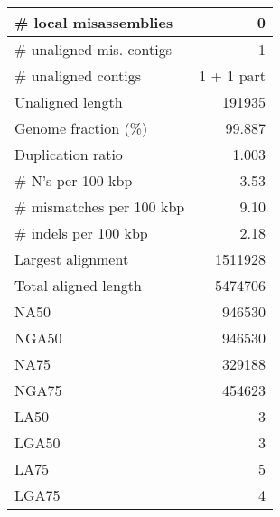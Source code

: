 \documentclass[12pt,a4paper]{article}
\begin{document}
\begin{table}[ht]
\begin{center}
\begin{tabular}{|l*{1}{|r}|}
\# local misassemblies & 0 \\ \hline
\# unaligned mis. contigs & 1 \\ \hline
\# unaligned contigs & 1 + 1 part \\ \hline
Unaligned length & 191935 \\ \hline
Genome fraction (\%) & 99.887 \\ \hline
Duplication ratio & 1.003 \\ \hline
\# N's per 100 kbp & 3.53 \\ \hline
\# mismatches per 100 kbp & 9.10 \\ \hline
\# indels per 100 kbp & 2.18 \\ \hline
Largest alignment & 1511928 \\ \hline
Total aligned length & 5474706 \\ \hline
NA50 & 946530 \\ \hline
NGA50 & 946530 \\ \hline
NA75 & 329188 \\ \hline
NGA75 & 454623 \\ \hline
LA50 & 3 \\ \hline
LGA50 & 3 \\ \hline
LA75 & 5 \\ \hline
LGA75 & 4 \\ \hline
\end{tabular}
\end{center}
\end{table}
\end{document}
